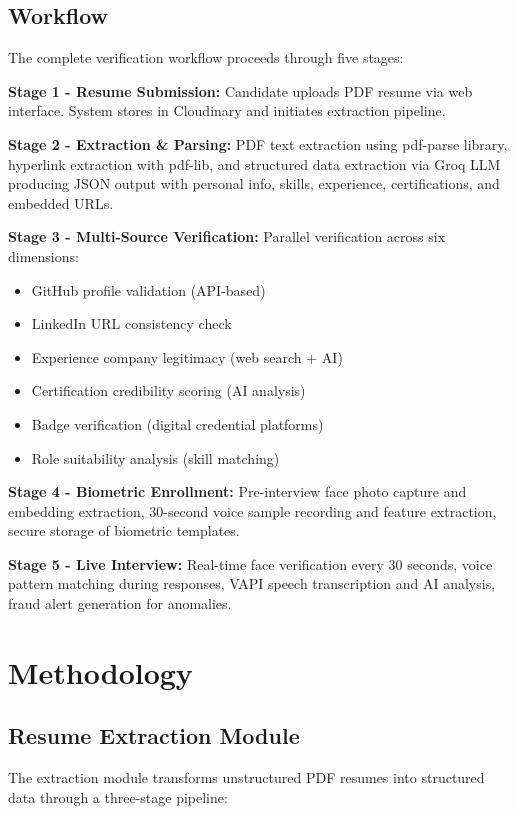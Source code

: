 \documentclass[journal]{IEEEtran}
\begin{document}
\subsection{Workflow}
The complete verification workflow proceeds through five stages:

\textbf{Stage 1 - Resume Submission:} Candidate uploads PDF resume via web interface. System stores in Cloudinary and initiates extraction pipeline.

\textbf{Stage 2 - Extraction \& Parsing:} PDF text extraction using pdf-parse library, hyperlink extraction with pdf-lib, and structured data extraction via Groq LLM producing JSON output with personal info, skills, experience, certifications, and embedded URLs.

\textbf{Stage 3 - Multi-Source Verification:} Parallel verification across six dimensions:
\begin{itemize}
\item GitHub profile validation (API-based)
\item LinkedIn URL consistency check
\item Experience company legitimacy (web search + AI)
\item Certification credibility scoring (AI analysis)
\item Badge verification (digital credential platforms)
\item Role suitability analysis (skill matching)
\end{itemize}

\textbf{Stage 4 - Biometric Enrollment:} Pre-interview face photo capture and embedding extraction, 30-second voice sample recording and feature extraction, secure storage of biometric templates.

\textbf{Stage 5 - Live Interview:} Real-time face verification every 30 seconds, voice pattern matching during responses, VAPI speech transcription and AI analysis, fraud alert generation for anomalies.

\section{Methodology}

\subsection{Resume Extraction Module}
The extraction module transforms unstructured PDF resumes into structured data through a three-stage pipeline:
\end{document}
